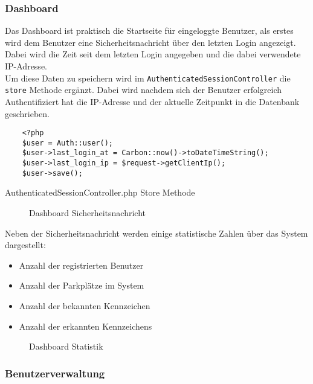\subsubsection{Dashboard}
Das Dashboard ist praktisch die Startseite für eingeloggte Benutzer, als erstes
wird dem Benutzer eine Sicherheitsnachricht über den letzten Login angezeigt.
Dabei wird die Zeit seit dem letzten Login angegeben und die dabei verwendete
IP-Adresse.\\

Um diese Daten zu speichern wird im \verb|AuthenticatedSessionController| die
\verb|store| Methode ergänzt. Dabei wird nachdem sich der Benutzer erfolgreich
Authentifiziert hat die IP-Adresse und der aktuelle Zeitpunkt in die Datenbank
geschrieben.

\begin{listing}[H]
  \begin{verbatim}
    <?php
    $user = Auth::user();
    $user->last_login_at = Carbon::now()->toDateTimeString();
    $user->last_login_ip = $request->getClientIp();
    $user->save();
  \end{verbatim}
  \caption{AuthenticatedSessionController.php Store Methode}
\end{listing}

\begin{figure}[H]
  \centering
  \caption{Dashboard Sicherheitsnachricht}
\end{figure}

Neben der Sicherheitsnachricht werden einige statistische Zahlen über das System
dargestellt:

\begin{itemize}
  \item Anzahl der registrierten Benutzer
  \item Anzahl der Parkplätze im System
  \item Anzahl der bekannten Kennzeichen
  \item Anzahl der erkannten Kennzeichens
\end{itemize}

\begin{figure}[H]
  \centering
  \caption{Dashboard Statistik}
\end{figure}

\subsubsection{Benutzerverwaltung}

